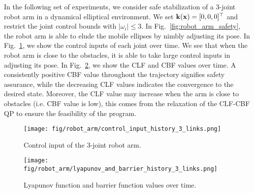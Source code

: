 In the following set of experiments, we consider safe stabilization of a 3-joint robot arm in a dynamical elliptical environment. We set ${\mathbf{k}}(\mathbf{x}) = [0, 0, 0]^\top$ and restrict the joint control bounds with $|\omega_i | \leq 3$. In Fig.~\ref{fig:robot_arm_safety}, the robot arm is able to elude the mobile ellipses by nimbly adjusting its pose. In Fig.~\ref{fig:robot_arm_control_input}, we show the control inputs of each joint over time. We see that when the robot arm is close to the obstacles, it is able to take large control inputs in adjusting its pose. In Fig.~\ref{fig:robot_arm_LF_BF}, we show the CLF and CBF values over time. A consistently positive CBF value throughout the trajectory signifies safety assurance, while the decreasing CLF values indicates the convergence to the desired state. Moreover, the CLF value may increase when the arm is close to obstacles (i.e. CBF value is low), this comes from the relaxation of the CLF-CBF QP to ensure the feasibility of the program. 





\begin{figure}
    \centering
    \texttt{[image: fig/robot\_arm/control\_input\_history\_3\_links.png]}
    \caption{Control input of the 3-joint robot arm. }
    \label{fig:robot_arm_control_input}
\end{figure}

\begin{figure}
    \centering
    \texttt{[image: fig/robot\_arm/lyapunov\_and\_barrier\_history\_3\_links.png]}
    \caption{Lyapunov function and barrier function values over time.}
    \label{fig:robot_arm_LF_BF}
\end{figure}